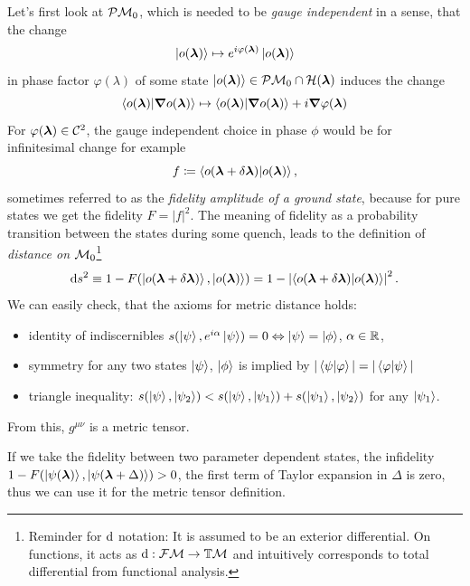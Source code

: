 Let's first look at $\mathcal{P}\mathcal{M}_0$, which is needed to be \emph{gauge independent} in a sense, that the change 
\begin{equation}
    \ket{o({\bm\lambda})}\mapsto e^{i\varphi({\bm\lambda})} \ket{o({\bm\lambda})}
\end{equation}
in phase factor $\varphi(\lambda)$ of some state $\ket{o({\bm\lambda})}\in \mathcal{P}\mathcal{M}_0\cap \mathcal{H}({\bm\lambda})$ induces the change 
\begin{equation}
        \braket{o({\bm\lambda})|\bm \nabla o({\bm\lambda})}\mapsto \braket{o({\bm\lambda})|\bm \nabla o({\bm\lambda})} + i\bm \nabla \varphi({\bm\lambda}) 
\end{equation} 
For $\varphi({\bm\lambda})\in \mathcal C^2$, the gauge independent choice in phase $\phi$ would be for infinitesimal change for example
\begin{equation}
    f\coloneqq \braket{o(\bm{{\bm\lambda}}+\delta\bm{{\bm\lambda}})|o(\bm{{\bm\lambda}})},
    \label{eq:fidelityDefinition}
\end{equation}
sometimes referred to as the \emph{fidelity amplitude of a ground state}, because for pure states we get the fidelity $F=|f|^2$. The meaning of fidelity as a probability transition between the states during some quench, leads to the definition of \emph{distance on $\mathcal{M}_0$}\footnote{Reminder for $\mathrm{d}$ notation: It is assumed to be an exterior differential. On functions, it acts as $\mathrm{d}: \mathcal{F}\mathcal{M}\rightarrow \mathbb{T}\mathcal{M}$ and intuitively corresponds to total differential from functional analysis.}
\begin{equation}
    \mathrm{d} s^2 \equiv 1-F(\ket{o(\bm{{\bm\lambda}}+\delta\bm{{\bm\lambda}})},\ket{o({\bm\lambda})})= 1-\left|\braket{o(\bm{{\bm\lambda}}+\delta\bm{{\bm\lambda}})|o(\bm{{\bm\lambda}})}\right|^2.
    \label{eq:distanceOnM0}
\end{equation}
We can easily check, that the axioms for metric distance holds:
\begin{itemize}
    \item identity of indiscernibles $s(\ket{\psi},e^{i\alpha}\ket{\psi}) = 0 \Leftrightarrow \ket{\psi}=\ket{\phi}$, $\alpha\in\mathbb{R}$,
    \item symmetry for any two states $\ket{\psi}$, $\ket{\phi}$ is implied by $|\braket{\psi|\varphi}|=|\braket{\varphi|\psi}|$
    \item triangle inequality: $s(\ket{\psi},\ket{\psi_2}) <s(\ket{\psi},\ket{\psi_1}) + s(\ket{\psi_1},\ket{\psi_2})$ for any $\ket{\psi_1}$.
\end{itemize}
From this, $g^{\mu\nu}$ is a metric tensor.

If we take the fidelity between two parameter dependent states, the infidelity $1-F(\ket{\psi({\bm\lambda})},\ket{\psi({\bm\lambda}+\Delta)})>0$, the first term of Taylor expansion in $\Delta$ is zero, thus we can use it for the metric tensor definition.

